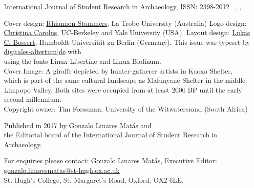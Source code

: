 
\IJSRAtitlepage
\thispagestyle{empty}
\hfill
\vfill

\begin{footnotesize}
\noindent International Journal of Student Research in Archaeology,\newline
ISSN: 2398-2012\newline
\IJSRAmonth\ \IJSRAyear , \IJSRAvolume , \IJSRAnumber\\
\vspace{2em}


\noindent Cover design: \href{https://latrobe.academia.edu/RhiannonStammers}{Rhiannon Stammers}, La Trobe University (Australia)\newline
\noindent Logo design: \href{https://hraf.yale.edu/about/staff/christina-carolus/}{Christina Carolus}, UC-Berkeley and Yale University (USA).\newline
\noindent Layout design: \href{https://hu-berlinhttps://dainst.academia.edu/LukasCBossert}{Lukas C. Bossert}, Humboldt-Universität zu Berlin (Germany). \newline \indent This issue was typeset by \href{www.digitales-altertum.de}{digitales-altertum|de}  with  \\ \indent using the fonts Linux Libertine and {\sffamily Linux Biolinum}.\\
Cover Image: 
A giraffe depicted by hunter-gatherer artists in Kaoxa Shelter, which is part of the same cultural landscape as Mafunyane Shelter in the middle Limpopo Valley. Both sites were occupied from at least 2000 BP until the early second millennium\AD.\\
Copyright owner: Tim Forssman, University of the Witwatersrand (South Africa)

\vspace{2em}

\noindent Published in 2017 by Gonzalo Linares Matás and \\ the Editorial board of the International Journal of Student Research in Archaeology. 




\vspace{2em}






\noindent For enquiries please contact: Gonzalo Linares Matás, Executive Editor:\\ \href{mailto:gonzalo.linaresmatas@st-hugh.ox.ac.uk}{gonzalo.linaresmatas@st-hugh.ox.ac.uk}\\  St. Hugh’s College, St. Margaret’s Road, Oxford, OX2 6LE.


\end{footnotesize}

